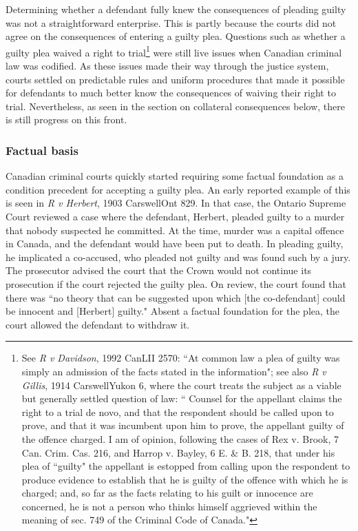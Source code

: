 Determining whether a defendant fully knew the consequences of pleading guilty was not a straightforward enterprise. This is partly because the courts did not agree on the consequences of entering a guilty plea. Questions such as whether a guilty plea waived a right to trial\footnote{See \textit{R v Davidson}, 1992 CanLII 2570: ``At common law a plea of guilty was simply an admission of the facts stated in the information"; see also \textit{R v Gillis}, 1914 CarswellYukon 6, where the court treats the subject as a viable but generally settled question of law: `` Counsel for the appellant claims the right to a trial de novo, and that the respondent should be called upon to prove, and that it was incumbent upon him to prove, the appellant guilty of the offence charged. I am of opinion, following the cases of Rex v. Brook, 7 Can. Crim. Cas. 216, and Harrop v. Bayley, 6 E. \& B. 218, that under his plea of ``guilty" the appellant is estopped from calling upon the respondent to produce evidence to establish that he is guilty of the offence with which he is charged; and, so far as the facts relating to his guilt or innocence are concerned, he is not a person who thinks himself aggrieved within the meaning of sec. 749 of the Criminal Code of Canada."} were still live issues when Canadian criminal law was codified. As these issues made their way through the justice system, courts settled on predictable rules and uniform procedures that made it possible for defendants to much better know the consequences of waiving their right to trial. Nevertheless, as seen in the section on collateral consequences below, there is still progress on this front.

\subsubsection{Factual basis}

Canadian criminal courts quickly started requiring some factual foundation as a condition precedent for accepting a guilty plea. An early reported example of this is seen in \textit{R v Herbert}, 1903 CarswellOnt 829. In that case, the Ontario Supreme Court reviewed a case where the defendant, Herbert, pleaded guilty to a murder that nobody suspected he committed. At the time, murder was a capital offence in Canada, and the defendant would have been put to death. In pleading guilty, he implicated a co-accused, who pleaded not guilty and was found such by a jury. The prosecutor advised the court that the Crown would not continue its prosecution if the court rejected the guilty plea. On review, the court found that there was ``no theory that can be suggested upon which [the co-defendant] could be innocent and [Herbert] guilty." Absent a factual foundation for the plea, the court allowed the defendant to withdraw it.


